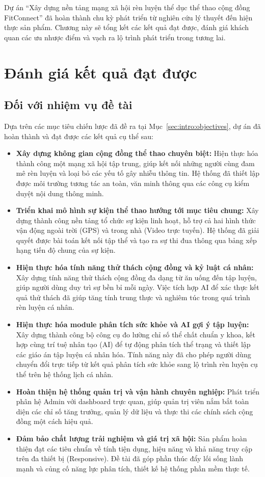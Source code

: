 
Dự án ``Xây dựng nền tảng mạng xã hội rèn luyện thể dục thể thao cộng đồng FitConnect'' đã hoàn thành chu kỳ phát triển từ nghiên cứu lý thuyết đến hiện thực sản phẩm. Chương này sẽ tổng kết các kết quả đạt được, đánh giá khách quan các ưu nhược điểm và vạch ra lộ trình phát triển trong tương lai.

\section{Đánh giá kết quả đạt được}

\subsection{Đối với nhiệm vụ đề tài}
Dựa trên các mục tiêu chiến lược đã đề ra tại Mục~\ref{sec:intro:objectives}, dự án đã hoàn thành và đạt được các kết quả cụ thể sau:
\begin{itemize}
    \item \textbf{Xây dựng không gian cộng đồng thể thao chuyên biệt:} Hiện thực hóa thành công một mạng xã hội tập trung, giúp kết nối những người cùng đam mê rèn luyện và loại bỏ các yếu tố gây nhiễu thông tin. Hệ thống đã thiết lập được môi trường tương tác an toàn, văn minh thông qua các công cụ kiểm duyệt nội dung thông minh.
    \item \textbf{Triển khai mô hình sự kiện thể thao hướng tới mục tiêu chung:} Xây dựng thành công nền tảng tổ chức sự kiện linh hoạt, hỗ trợ cả hai hình thức vận động ngoài trời (GPS) và trong nhà (Video trực tuyến). Hệ thống đã giải quyết được bài toán kết nối tập thể và tạo ra sự thi đua thông qua bảng xếp hạng tiến độ chung của sự kiện.
    \item \textbf{Hiện thực hóa tính năng thử thách cộng đồng và kỷ luật cá nhân:} Xây dựng tính năng thử thách cộng đồng đa dạng từ ăn uống đến tập luyện, giúp người dùng duy trì sự bền bỉ mỗi ngày. Việc tích hợp AI để xác thực kết quả thử thách đã giúp tăng tính trung thực và nghiêm túc trong quá trình rèn luyện cá nhân.
    \item \textbf{Hiện thực hóa module phân tích sức khỏe và AI gợi ý tập luyện:} Xây dựng thành công bộ công cụ đo lường chỉ số thể chất chuẩn y khoa, kết hợp cùng trí tuệ nhân tạo (AI) để tự động phân tích thể trạng và thiết lập các giáo án tập luyện cá nhân hóa. Tính năng này đã cho phép người dùng chuyển đổi trực tiếp từ kết quả phân tích sức khỏe sang lộ trình rèn luyện cụ thể trên hệ thống lịch cá nhân.
    \item \textbf{Hoàn thiện hệ thống quản trị và vận hành chuyên nghiệp:} Phát triển phân hệ Admin với dashboard trực quan, giúp quản trị viên nắm bắt toàn diện các chỉ số tăng trưởng, quản lý dữ liệu và thực thi các chính sách cộng đồng một cách hiệu quả.
    \item \textbf{Đảm bảo chất lượng trải nghiệm và giá trị xã hội:} Sản phẩm hoàn thiện đạt các tiêu chuẩn về tính tiện dụng, hiệu năng và khả năng truy cập trên đa thiết bị (Responsive). Đề tài đã góp phần thúc đẩy lối sống lành mạnh và củng cố năng lực phân tích, thiết kế hệ thống phần mềm thực tế.
\end{itemize}

